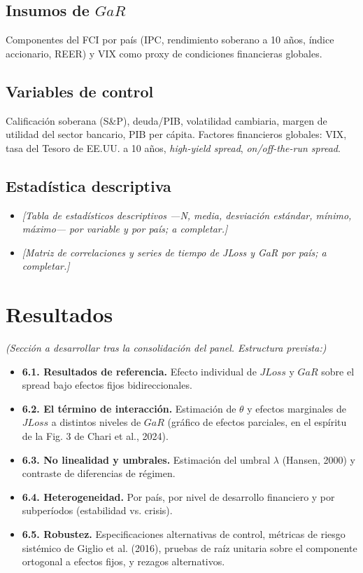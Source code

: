 \documentclass[5p,times,twocolumn,authoryear]{elsarticle}
\begin{document}
\subsection{Insumos de $GaR$}
Componentes del FCI por país (IPC, rendimiento soberano a 10 años, índice accionario, REER) y VIX como proxy de condiciones financieras globales.

\subsection{Variables de control}
Calificación soberana (S\&P), deuda/PIB, volatilidad cambiaria, margen de utilidad del sector bancario, PIB per cápita. Factores financieros globales: VIX, tasa del Tesoro de EE.UU. a 10 años, \textit{high-yield spread}, \textit{on/off-the-run spread}.

\subsection{Estadística descriptiva}
\begin{itemize}
    \item \textit{[Tabla de estadísticos descriptivos —N, media, desviación estándar, mínimo, máximo— por variable y por país; a completar.]}
    \item \textit{[Matriz de correlaciones y series de tiempo de JLoss y GaR por país; a completar.]}
\end{itemize}


\section{Resultados}

\textit{(Sección a desarrollar tras la consolidación del panel. Estructura prevista:)}

\begin{itemize}
    \item \textbf{6.1. Resultados de referencia.} Efecto individual de $JLoss$ y $GaR$ sobre el spread bajo efectos fijos bidireccionales.
    \item \textbf{6.2. El término de interacción.} Estimación de $\theta$ y efectos marginales de $JLoss$ a distintos niveles de $GaR$ (gráfico de efectos parciales, en el espíritu de la Fig. 3 de Chari et al., 2024).
    \item \textbf{6.3. No linealidad y umbrales.} Estimación del umbral $\lambda$ (Hansen, 2000) y contraste de diferencias de régimen.
    \item \textbf{6.4. Heterogeneidad.} Por país, por nivel de desarrollo financiero y por subperíodos (estabilidad vs. crisis).
    \item \textbf{6.5. Robustez.} Especificaciones alternativas de control, métricas de riesgo sistémico de Giglio et al. (2016), pruebas de raíz unitaria sobre el componente ortogonal a efectos fijos, y rezagos alternativos.
\end{itemize}
\end{document}
